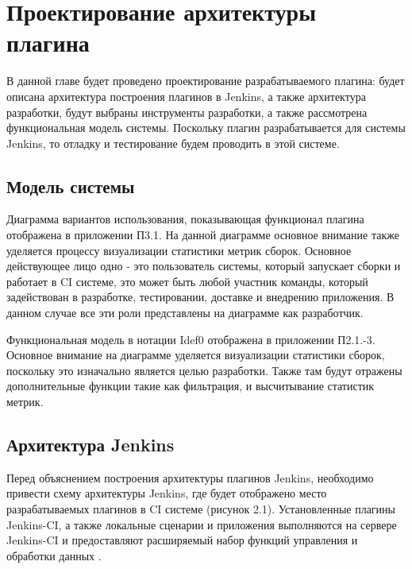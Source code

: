 \chapter{Проектирование архитектуры плагина} \label{ch2}
	
В данной главе будет проведено проектирование разрабатываемого плагина: будет описана архитектура построения плагинов в Jenkins, а также архитектура разработки, будут выбраны инструменты разработки, а также рассмотрена функциональная модель системы. Поскольку плагин разрабатывается для системы Jenkins, то отладку и тестирование будем проводить в этой системе.

\section{Модель системы} \label{ch1:sec1}

Диаграмма вариантов использования, показывающая функционал плагина отображена в приложении П3.1. На данной диаграмме основное внимание также уделяется процессу визуализации статистики метрик сборок. Основное действующее лицо одно - это пользователь системы, который запускает сборки и работает в CI системе, это может быть любой участник команды, который задействован в разработке, тестировании, доставке и внедрению приложения. В данном случае все эти роли представлены на диаграмме как разработчик.

Функциональная модель в нотации Idef0 отображена в приложении П2.1.-3. Основное внимание на диаграмме уделяется визуализации статистики сборок, поскольку это изначально является целью разработки. Также там будут отражены дополнительные функции такие как фильтрация, и высчитывание статистик метрик.

\section{Архитектура Jenkins} \label{ch1:sec2}

Перед объяснением построения архитектуры плагинов Jenkins, необходимо привести схему архитектуры Jenkins, где будет отображено место разрабатываемых плагинов в CI системе (рисунок 2.1). Установленные плагины Jenkins-CI, а также локальные сценарии и приложения выполняются на сервере Jenkins-CI и предоставляют расширяемый набор функций управления и обработки данных \cite{article}.

